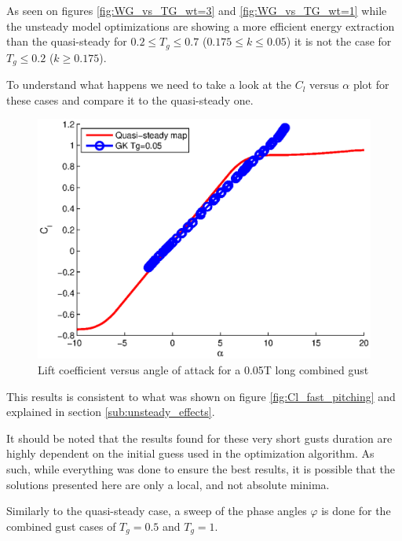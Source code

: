 \par As seen on figures \ref{fig:WG_vs_TG_wt=3} and \ref{fig:WG_vs_TG_wt=1} while the unsteady model optimizations are showing a more efficient energy extraction than the quasi-steady for $0.2 \leq T_g \leq 0.7$ ($0.175 \leq k \leq 0.05$) it is not the case for $T_g \le 0.2$ ($k\ge 0.175$). 

To understand what happens we need to take a look at the $C_l$ versus $\alpha$ plot for these cases and compare it to the quasi-steady one.

\begin{figure}[h]
  \centering
  \includegraphics{./Figures/Cl_vs_alpha_Windtype=3_Tg=0p05_GK_alphamax=12.eps}
  \caption{Lift coefficient versus angle of attack for a 0.05T long combined gust}
  \label{fig:Cl_vs_alpha_Windtype=3_Tg=0p05_GK_alphamax=12}
\end{figure}

\FloatBarrier

\par This results is consistent to what was shown on figure \ref{fig:Cl_fast_pitching} and explained in section \ref{sub:unsteady_effects}.

\par It should be noted that the results found for these very short gusts duration are highly dependent on the initial guess used in the optimization algorithm.
As such, while everything was done to ensure the best results, it is possible that the solutions presented here are only a local, and not absolute minima.

Similarly to the quasi-steady case, a sweep of the phase angles $\varphi$ is done for the combined gust cases of $T_g=0.5$ and $T_g=1$.

